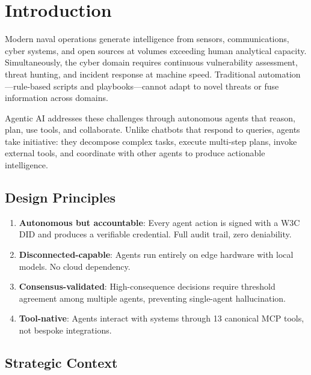 \documentclass[11pt,letterpaper]{article}
\begin{document}
\tableofcontents
\newpage

\section{Introduction}

Modern naval operations generate intelligence from sensors, communications, cyber systems, and open sources at volumes exceeding human analytical capacity. Simultaneously, the cyber domain requires continuous vulnerability assessment, threat hunting, and incident response at machine speed. Traditional automation---rule-based scripts and playbooks---cannot adapt to novel threats or fuse information across domains.

Agentic AI addresses these challenges through autonomous agents that reason, plan, use tools, and collaborate. Unlike chatbots that respond to queries, agents take initiative: they decompose complex tasks, execute multi-step plans, invoke external tools, and coordinate with other agents to produce actionable intelligence.

\subsection{Design Principles}

\begin{enumerate}
\item \textbf{Autonomous but accountable}: Every agent action is signed with a W3C DID and produces a verifiable credential. Full audit trail, zero deniability.
\item \textbf{Disconnected-capable}: Agents run entirely on edge hardware with local models. No cloud dependency.
\item \textbf{Consensus-validated}: High-consequence decisions require threshold agreement among multiple agents, preventing single-agent hallucination.
\item \textbf{Tool-native}: Agents interact with systems through 13 canonical MCP tools, not bespoke integrations.
\end{enumerate}

\subsection{Strategic Context}
\end{document}
